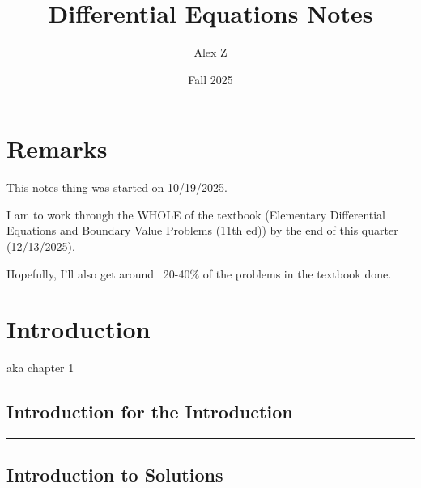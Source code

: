 \documentclass{article}
\title{Differential Equations Notes}
\author{Alex Z}
\date{Fall 2025}
\newcommand{\hr}{\rule{\linewidth}{1pt}}
\newcommand{\spacer}{\vspace{1cm} \hr \vspace{1cm}}
\theoremstyle{definition}
\begin{document}
\maketitle
\newpage

\tableofcontents
\newpage


\section*{Remarks}

This notes thing was started on 10/19/2025.

I am to work through the WHOLE of the textbook (Elementary Differential Equations and Boundary Value Problems (11th ed)) by the end of this quarter (12/13/2025).

Hopefully, I'll also get around ~20-40\% of the problems in the textbook done.

\newpage

\section{Introduction}

aka chapter 1

\subsection{Introduction for the Introduction}
 

\spacer

\subsection{Introduction to Solutions}

\end{document}
